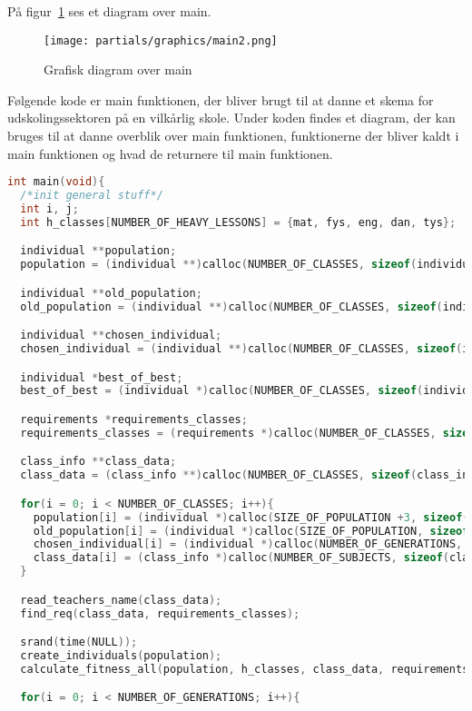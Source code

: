 På figur~\ref{fig:diagrammain} ses et diagram over main.
\begin{figure}[!h]
\texttt{[image: partials/graphics/main2.png]}
\caption{Grafisk diagram over main}
\label{fig:diagrammain}
\end{figure}

Følgende kode er main funktionen, der bliver brugt til at danne et skema for udskolingssektoren på en vilkårlig skole. Under koden findes et diagram, der kan bruges til at danne overblik over main funktionen, funktionerne der bliver kaldt i main funktionen og hvad de returnere til main funktionen. 
\begin{lstlisting}[showstringspaces=false,language = c]
int main(void){
  /*init general stuff*/
  int i, j; 
  int h_classes[NUMBER_OF_HEAVY_LESSONS] = {mat, fys, eng, dan, tys};

  individual **population;
  population = (individual **)calloc(NUMBER_OF_CLASSES, sizeof(individual *));

  individual **old_population;
  old_population = (individual **)calloc(NUMBER_OF_CLASSES, sizeof(individual *));

  individual **chosen_individual;
  chosen_individual = (individual **)calloc(NUMBER_OF_CLASSES, sizeof(individual *));

  individual *best_of_best;
  best_of_best = (individual *)calloc(NUMBER_OF_CLASSES, sizeof(individual ));

  requirements *requirements_classes;
  requirements_classes = (requirements *)calloc(NUMBER_OF_CLASSES, sizeof(requirements));

  class_info **class_data;
  class_data = (class_info **)calloc(NUMBER_OF_CLASSES, sizeof(class_info *));

  for(i = 0; i < NUMBER_OF_CLASSES; i++){
    population[i] = (individual *)calloc(SIZE_OF_POPULATION +3, sizeof(individual));
    old_population[i] = (individual *)calloc(SIZE_OF_POPULATION, sizeof(individual));
    chosen_individual[i] = (individual *)calloc(NUMBER_OF_GENERATIONS, sizeof(individual));
    class_data[i] = (class_info *)calloc(NUMBER_OF_SUBJECTS, sizeof(class_info));
  }

  read_teachers_name(class_data);
  find_req(class_data, requirements_classes);

  srand(time(NULL));
  create_individuals(population);
  calculate_fitness_all(population, h_classes, class_data, requirements_classes);

  for(i = 0; i < NUMBER_OF_GENERATIONS; i++){


\end{lstlisting}
